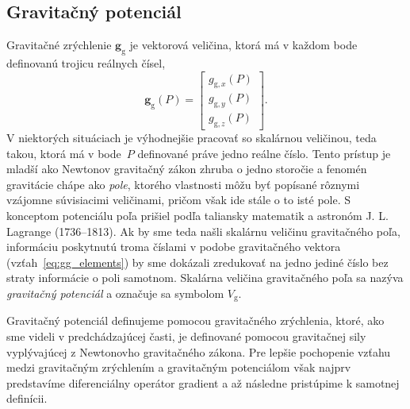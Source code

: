 \documentclass[a4paper, 12pt]{book}
\newcommand{\gidx}{\mathrm g}
\let\vec\mathbf
\begin{document}
\subsection{Gravitačný potenciál}
\label{sec:vg}

Gravitačné zrýchlenie $\vec g_\gidx$ je vektorová veličina, ktorá má v každom 
bode definovanú trojicu reálnych čísel,
%
\begin{equation}
\label{eq:gg_elements}
\vec g_{\gidx}(P) =
\begin{bmatrix}
g_{\gidx,x}(P) \\[2ex]
g_{\gidx,y}(P) \\[2ex]
g_{\gidx,z}(P)
\end{bmatrix}
{.}
\end{equation}
%
V niektorých situáciach je výhodnejšie pracovať so skalárnou veličinou, teda 
takou, ktorá má v bode~$P$ definované práve jedno reálne číslo.  Tento prístup 
je mladší ako Newtonov gravitačný zákon zhruba o jedno storočie 
\citep{MacMillan1930,Jekeli2015} a fenomén gravitácie chápe ako \emph{pole}, 
ktorého vlastnosti môžu byť popísané rôznymi vzájomne súvisiacimi veličinami, 
pričom však ide stále o to isté pole.  S konceptom potenciálu poľa prišiel 
podľa \cite{MacMillan1930} taliansky matematik a astronóm J. L. Lagrange 
(1736--1813).  Ak by sme teda našli skalárnu veličinu gravitačného poľa, 
informáciu poskytnutú troma číslami v podobe gravitačného vektora 
(vzťah~\ref{eq:gg_elements}) by sme dokázali zredukovať na jedno jediné číslo 
bez straty informácie o poli samotnom.  Skalárna veličina gravitačného poľa sa 
nazýva \emph{gravitačný potenciál} a označuje sa symbolom $V_\gidx$.

Gravitačný potenciál definujeme pomocou gravitačného zrýchlenia, ktoré, ako sme 
videli v predchádzajúcej časti, je definované pomocou gravitačnej sily 
vyplývajúcej z Newtonovho gravitačného zákona.  Pre lepšie pochopenie vzťahu 
medzi gravitačným zrýchlením a gravitačným potenciálom však najprv predstavíme 
diferenciálny operátor gradient a až následne pristúpime k samotnej definícii.
\end{document}
